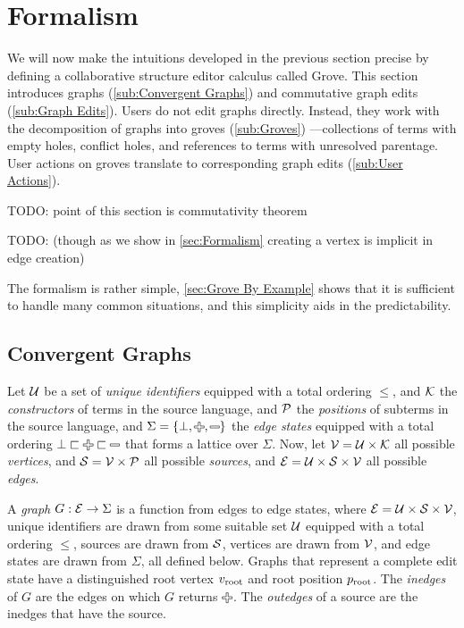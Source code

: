 
\section{Formalism}%
\label{sec:Formalism}


We will now make the intuitions developed in the previous section precise by defining a collaborative structure editor calculus called Grove.
This section introduces
  graphs (\autoref{sub:Convergent Graphs})
  and commutative graph edits (\autoref{sub:Graph Edits}).
Users do not edit graphs directly.
Instead, they work with the decomposition of graphs into groves (\autoref{sub:Groves})%
---collections of terms with empty holes, conflict holes, and references to terms with unresolved parentage.
User actions on groves translate to corresponding graph edits (\autoref{sub:User Actions}).


TODO: point of this section is commutativity theorem

TODO: (though as we show in \autoref{sec:Formalism} creating a vertex is implicit in edge creation)

The formalism is rather simple, \autoref{sec:Grove By Example} shows
that it is sufficient to handle many common situations,
and this simplicity aids in the predictability.

\figureArity{}

\subsection{Convergent Graphs}%
\label{sub:Convergent Graphs}

Let $\U$ be a set of \emph{unique identifiers} equipped with a total ordering $\leq$,
and $\K$ the \emph{constructors} of terms in the source language,
and $\P$ the \emph{positions} of subterms in the source language,
and $\Sigma = \SetOf{\bot, \Plus, \Minus}$ the
  \emph{edge states} equipped with a total ordering $\bot \sqsubset \Plus \sqsubset \Minus$ that forms a lattice over $\Sigma$.
Now, let $\V = \U \times \K$ all possible \emph{vertices},
and $\S = \V \times \P$ all possible \emph{sources},
and $\E = \U \times \S \times \V$ all possible \emph{edges}.

A \emph{graph} $G : \E \rightarrow \Sigma$ is a function from edges to edge states,
  where $\E = \U \times \S \times \V$,
  unique identifiers are drawn from some suitable set $\U$ equipped with a total ordering $\leq$,
  sources are drawn from $\S$,
  vertices are drawn from $\V$,
  and edge states are drawn from $\Sigma$,
  all defined below.
Graphs that represent a complete edit state have a distinguished
  root vertex $\rootVertex$
  and root position $\rootPosition$.
The \emph{inedges} of $G$ are the edges on which $G$ returns $\Plus$.
The \emph{outedges} of a source are the inedges that have the source.

